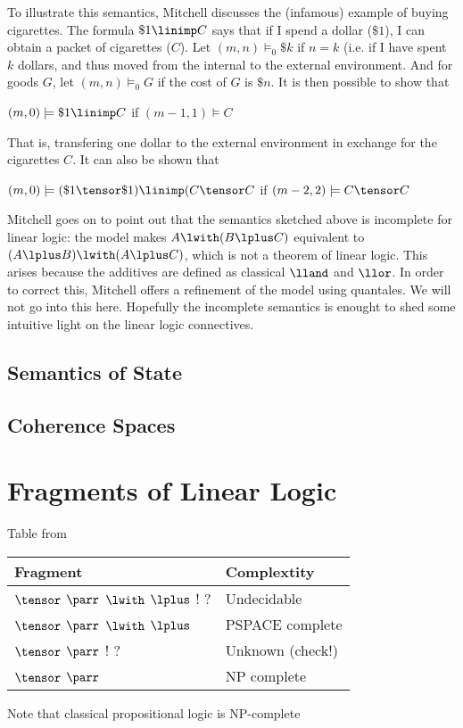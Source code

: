 To illustrate this semantics, Mitchell discusses the (infamous) example of
buying cigarettes.  The formula $ \$ 1\linimp C$ says that if I spend
a dollar ($ \$ 1$), I can obtain a packet of cigarettes ($C$).  Let
$(m,n)\models_0 \$ k$ if $n=k$ (i.e. if I have spent $k$ dollars, and thus
moved from the internal to the external environment.  And for goods $G$,
let $(m,n)\models_0 G$ if the cost of $G$ is $ \$n$.  It is then possible
to show that
\begin{center}
$(m,0)\models \$ 1\linimp C$ if $(m-1,1) \models C$
\end{center}
That is, transfering one dollar to the external environment in exchange for
the cigarettes $C$.  It can also be shown that
\begin{center}
$(m,0)\models (\$ 1\tensor \$ 1) \linimp (C\tensor C$ 
if $(m-2,2) \models C\tensor C$
\end{center}

Mitchell goes on to point out that the semantics sketched above is incomplete
for linear logic: the model makes $A\lwith(B\lplus C)$ equivalent to
$(A\lplus B) \lwith (A\lplus C)$, which is not a theorem of linear logic.
This arises because the additives are defined as classical $\lland$ 
and $\llor$.  In order to correct this, Mitchell offers a refinement of the
model using quantales.  We will not go into this here.  Hopefully the
incomplete semantics is enought to shed some intuitive 
light on the linear logic connectives.

\subsection{Semantics of State}


\subsection{Coherence Spaces}



\section{Fragments of Linear Logic}

Table from 

\begin{center}
\begin{tabular}{|l|l|}\hline
Fragment   & Complextity\\ \hline
$\tensor$ $\parr$ $\lwith$ $\lplus$ ! ? & Undecidable\\
$\tensor$ $\parr$ $\lwith$ $\lplus$ & PSPACE complete\\
$\tensor$ $\parr$ ! ? & Unknown (check!)\\
$\tensor$ $\parr$ & NP complete\\\hline
\end{tabular}
\end{center}
Note that classical propositional logic is NP-complete

